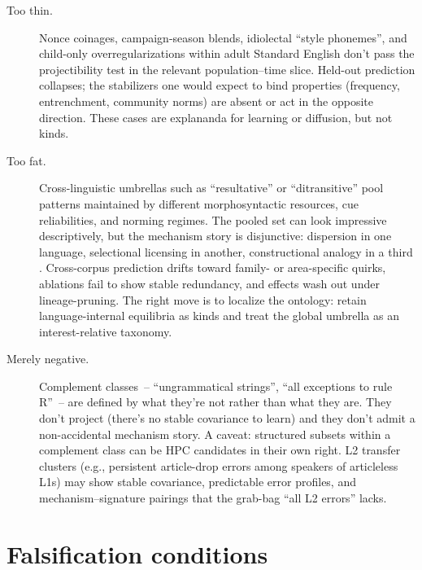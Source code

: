 \begin{description}
    \item[Too thin.] Nonce coinages, campaign-season blends, idiolectal \enquote{style phonemes}, and child-only overregularizations within adult Standard English don't pass the projectibility test in the relevant population--time slice. Held-out prediction collapses; the stabilizers one would expect to bind properties (frequency, entrenchment, community norms) are absent or act in the opposite direction. These cases are explananda for learning or diffusion, but not kinds.
    
    \item[Too fat.] Cross-linguistic umbrellas such as \enquote{resultative} or \enquote{ditransitive} pool patterns maintained by different morphosyntactic resources, cue reliabilities, and norming regimes. The pooled set can look impressive descriptively, but the mechanism story is disjunctive: dispersion in one language, selectional licensing in another, constructional analogy in a third \parencite{croft2001,haspelmath2010}. Cross-corpus prediction drifts toward family- or area-specific quirks, ablations fail to show stable redundancy, and effects wash out under lineage-pruning. The right move is to localize the ontology: retain language-internal equilibria as kinds and treat the global umbrella as an interest-relative taxonomy.
    
    \item[Merely negative.] Complement classes~-- \enquote{ungrammatical strings}, \enquote{all exceptions to rule R}~-- are defined by what they're not rather than what they are. They don't project (there's no stable covariance to learn) and they don't admit a non-accidental mechanism story. A caveat: structured subsets within a complement class can be HPC candidates in their own right. L2 transfer clusters (e.g., persistent article-drop errors among speakers of articleless L1s) may show stable covariance, predictable error profiles, and mechanism--signature pairings that the grab-bag \enquote{all L2 errors} lacks.
\end{description}

\section{Falsification conditions}

